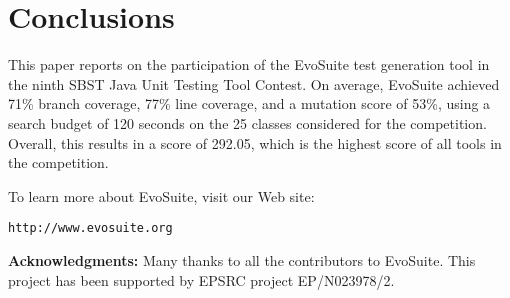 \documentclass[10pt,conference]{IEEEtran}
\newcommand{\EVOSUITE}{{\sc EvoSuite}\xspace}
\begin{document}
\section{Conclusions}

This paper reports on the participation of the \EVOSUITE test generation tool
in the ninth SBST Java Unit Testing Tool Contest. On average, \EVOSUITE achieved
71\% branch coverage, 77\% line coverage, and a mutation score of 53\%, using a
search budget of 120 seconds on the 25 classes considered for the competition.
Overall, this results in a score of 292.05, which is the highest score of all
tools in the competition.


To learn more about \EVOSUITE, visit our Web site:
\begin{center}
\texttt{http://www.evosuite.org}
\end{center}



\textbf{Acknowledgments:} Many thanks to all the contributors to
\EVOSUITE.
This project has been supported by EPSRC project %
EP/N023978/2.




\balance
\end{document}
